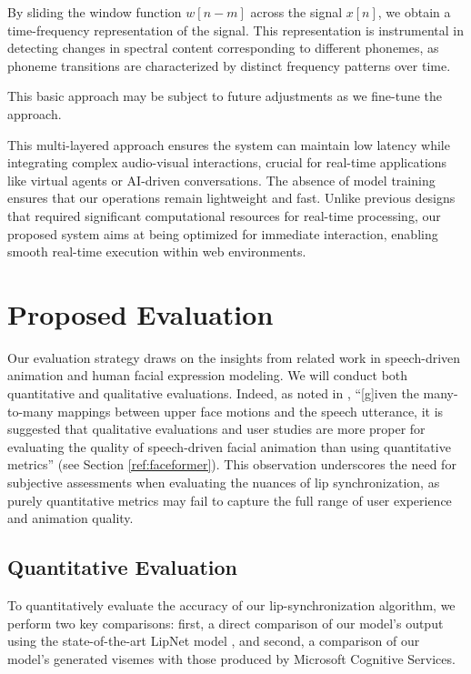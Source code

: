 \documentclass[12pt]{article}
\begin{document}
By sliding the window function \( w[n - m] \) across the signal \( x[n] \), we obtain a time-frequency representation of the signal. This representation is instrumental in detecting changes in spectral content corresponding to different phonemes, as phoneme transitions are characterized by distinct frequency patterns over time.

This basic approach may be subject to future adjustments as we fine-tune the approach.

This multi-layered approach ensures the system can maintain low latency while integrating complex audio-visual interactions, crucial for real-time applications like virtual agents or AI-driven conversations.  The absence of model training ensures that our operations remain lightweight and fast. Unlike previous designs that required significant computational resources for real-time processing, our proposed system aims at being optimized for immediate interaction, enabling smooth real-time execution within web environments.
\section{Proposed Evaluation}
\label{sec:eval}
Our evaluation strategy draws on the insights from related work in speech-driven animation and human facial expression modeling. We will conduct both quantitative and qualitative evaluations. Indeed, as noted in \cite{Fan2022}, ``[g]iven the many-to-many mappings between upper face motions and the speech utterance, it is suggested that qualitative evaluations and user studies are more proper for evaluating the quality of speech-driven facial animation than using quantitative metrics'' (see Section \ref{ref:faceformer}). This observation underscores the need for subjective assessments when evaluating the nuances of lip synchronization, as purely quantitative metrics may fail to capture the full range of user experience and animation quality.

\subsection{Quantitative Evaluation}

To quantitatively evaluate the accuracy of our lip-synchronization algorithm, we perform two key comparisons: first, a direct comparison of our model’s output using the state-of-the-art LipNet model \cite{AssaelLIPNET:LIPREADING}, and second, a comparison of our model’s generated visemes with those produced by Microsoft Cognitive Services.
\end{document}
